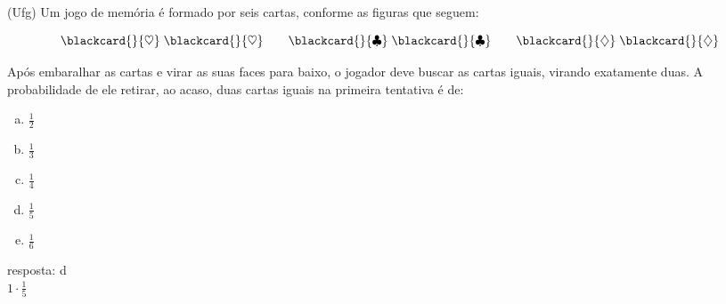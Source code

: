 \begin{ex}
(Ufg) Um jogo de memória é formado por seis cartas, conforme as figuras que seguem:

$$
\blackcard{}{\heartsuit}
\phantom{;}
\blackcard{}{\heartsuit}
\qquad
\blackcard{}{\clubsuit}
\phantom{;}
\blackcard{}{\clubsuit}
\qquad
\blackcard{}{\diamondsuit}
\phantom{;}
\blackcard{}{\diamondsuit}
$$

Após embaralhar as cartas e virar as suas faces para baixo, o jogador deve buscar as cartas iguais, virando exatamente duas. A probabilidade de ele retirar, ao acaso, duas cartas iguais na primeira tentativa é de:
   \begin{enumerate}[(a)]
   \item $\frac{1}{2}$
   \item $\frac{1}{3}$
   \item $\frac{1}{4}$
   \item $\frac{1}{5}$
   \item $\frac{1}{6}$
   \end{enumerate}
     \begin{sol}
      resposta: d \\
      $1\cdot\frac{1}{5}$
     \end{sol}
\end{ex}